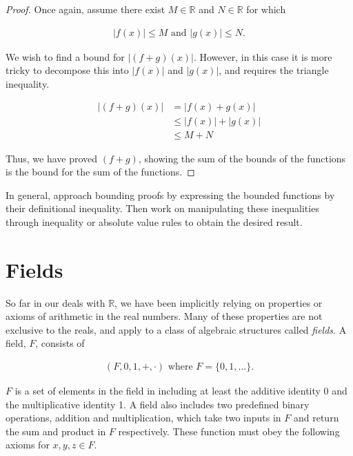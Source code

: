 \documentclass[twoside]{report}
\begin{document}
\begin{proof}
	Once again, assume there exist $M \in \mathbb{R}$ and $N \in \mathbb{R}$ for which
	
	\begin{align*}
		|f(x)| \le M \text{ and } |g(x)| \le N.
	\end{align*}
	
	We wish to find a bound for $|(f + g)(x)|$. However, in this case it is more tricky to decompose this into $|f(x)|$ and $|g(x)|$, and requires the triangle inequality.
	
	\begin{align*}
		|(f + g)(x)| &= |f(x) + g(x)| \\
		&\le |f(x)| + |g(x)| \\
		&\le M + N
	\end{align*}
	
	Thus, we have proved $(f + g)$, showing the sum of the bounds of the functions is the bound for the sum of the functions.
\end{proof}
\vspace{\baselineskip}

In general, approach bounding proofs by expressing the bounded functions by their definitional inequality. Then work on manipulating these inequalities through inequality or absolute value rules to obtain the desired result.

\section{Fields}

So far in our deals with $\mathbb{R}$, we have been implicitly relying on properties or axioms of arithmetic in the real numbers. Many of these properties are not exclusive to the reals, and apply to a class of algebraic structures called \emph{fields}. A field, $F$, consists of

\begin{align*}
	(F, 0, 1, +, \cdot) \text{ where } F = \{ 0, 1, \dots \}. 
\end{align*}

$F$ is a set of elements in the field in including at least the additive identity 0 and the multiplicative identity 1. A field also includes two predefined binary operations, addition and multiplication, which take two inputs in $F$ and return the sum and product in $F$ respectively. These function must obey the following axioms for $x, y, z \in F$.
\end{document}
